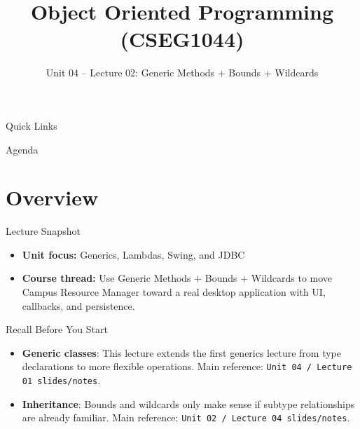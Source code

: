 \documentclass{beamer}
\title[OOPS with Java]{Object Oriented Programming (CSEG1044)}
\subtitle{Unit 04 -- Lecture 02: Generic Methods + Bounds + Wildcards}
\begin{document}
\begin{frame}[fragile]
  \titlepage
  \vspace{0.5em}
  \slidesources{\OOPSUnitIVSources}
\end{frame}

\begin{frame}{Quick Links}
  \centering
  \hyperlink{sec:overview}{}\hspace{0.6em}
  \hyperlink{sec:concepts}{}\hspace{0.6em}
  \hyperlink{sec:demo}{}\hspace{0.6em}
  \hyperlink{sec:summary}{}
  \slidesources{\OOPSUnitIVSources}
\end{frame}

\begin{frame}{Agenda}
  \tableofcontents
  \slidesources{\OOPSUnitIVSources}
\end{frame}

\section{Overview}
\label{sec:overview}

\begin{frame}{Lecture Snapshot}
\begin{itemize}[<+->]
  \item \textbf{Unit focus:} Generics, Lambdas, Swing, and JDBC
  \item \textbf{Course thread:} Use Generic Methods + Bounds + Wildcards to move Campus Resource Manager toward a real desktop application with UI, callbacks, and persistence.
\end{itemize}
  \slidesources{\OOPSUnitIVSources}
\end{frame}

\begin{frame}{Recall Before You Start}
\begin{itemize}[<+->]
  \item \textbf{Generic classes}: This lecture extends the first generics lecture from type declarations to more flexible operations. Main reference: \texttt{Unit 04 / Lecture 01 slides/notes}.
  \item \textbf{Inheritance}: Bounds and wildcards only make sense if subtype relationships are already familiar. Main reference: \texttt{Unit 02 / Lecture 04 slides/notes}.
\end{itemize}
  \slidesources{\OOPSUnitIVSources}
\end{frame}
\end{document}
